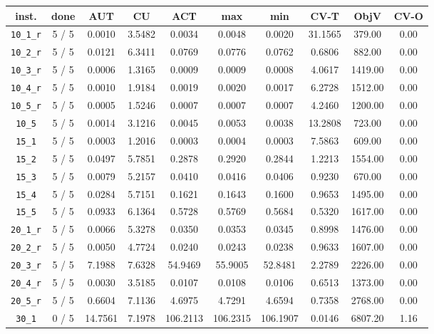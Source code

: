 \begin{table}[h!]
\begin{center}
\small
\begin{tabular}{| c | c | c | c | c | c | c | c | c | c |}
\hline
inst. & done & AUT & CU & ACT & max & min & CV-T & ObjV & CV-O \\
\hline
\verb|10_1_r| & 5 / 5 & 0.0010 & 3.5482 & 0.0034 & 0.0048 & 0.0020 & 31.1565 & 379.00 & 0.00\\ 
\verb|10_2_r| & 5 / 5 & 0.0121 & 6.3411 & 0.0769 & 0.0776 & 0.0762 & 0.6806 & 882.00 & 0.00\\ 
\verb|10_3_r| & 5 / 5 & 0.0006 & 1.3165 & 0.0009 & 0.0009 & 0.0008 & 4.0617 & 1419.00 & 0.00\\ 
\verb|10_4_r| & 5 / 5 & 0.0010 & 1.9184 & 0.0019 & 0.0020 & 0.0017 & 6.2728 & 1512.00 & 0.00\\ 
\verb|10_5_r| & 5 / 5 & 0.0005 & 1.5246 & 0.0007 & 0.0007 & 0.0007 & 4.2460 & 1200.00 & 0.00\\ 
\verb|10_5| & 5 / 5 & 0.0014 & 3.1216 & 0.0045 & 0.0053 & 0.0038 & 13.2808 & 723.00 & 0.00\\ 
\verb|15_1| & 5 / 5 & 0.0003 & 1.2016 & 0.0003 & 0.0004 & 0.0003 & 7.5863 & 609.00 & 0.00\\ 
\verb|15_2| & 5 / 5 & 0.0497 & 5.7851 & 0.2878 & 0.2920 & 0.2844 & 1.2213 & 1554.00 & 0.00\\ 
\verb|15_3| & 5 / 5 & 0.0079 & 5.2157 & 0.0410 & 0.0416 & 0.0406 & 0.9230 & 670.00 & 0.00\\ 
\verb|15_4| & 5 / 5 & 0.0284 & 5.7151 & 0.1621 & 0.1643 & 0.1600 & 0.9653 & 1495.00 & 0.00\\ 
\verb|15_5| & 5 / 5 & 0.0933 & 6.1364 & 0.5728 & 0.5769 & 0.5684 & 0.5320 & 1617.00 & 0.00\\ 
\verb|20_1_r| & 5 / 5 & 0.0066 & 5.3278 & 0.0350 & 0.0353 & 0.0345 & 0.8998 & 1476.00 & 0.00\\ 
\verb|20_2_r| & 5 / 5 & 0.0050 & 4.7724 & 0.0240 & 0.0243 & 0.0238 & 0.9633 & 1607.00 & 0.00\\ 
\verb|20_3_r| & 5 / 5 & 7.1988 & 7.6328 & 54.9469 & 55.9005 & 52.8481 & 2.2789 & 2226.00 & 0.00\\ 
\verb|20_4_r| & 5 / 5 & 0.0030 & 3.5185 & 0.0107 & 0.0108 & 0.0106 & 0.6513 & 1373.00 & 0.00\\ 
\verb|20_5_r| & 5 / 5 & 0.6604 & 7.1136 & 4.6975 & 4.7291 & 4.6594 & 0.7358 & 2768.00 & 0.00\\ 
\verb|30_1| & 0 / 5 & 14.7561 & 7.1978 & 106.2113 & 106.2315 & 106.1907 & 0.0146 & 6807.20 & 1.16\\ 

\end{tabular}
\end{center}
\end{table}
